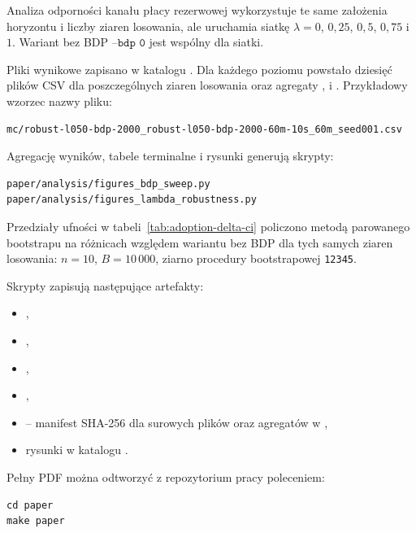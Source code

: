 Analiza odporności kanału płacy rezerwowej wykorzystuje te same założenia horyzontu i liczby ziaren losowania, ale uruchamia siatkę \(\lambda = 0\), \(0{,}25\), \(0{,}5\), \(0{,}75\) i \(1\). Wariant bez BDP \(\texttt{--bdp 0}\) jest wspólny dla siatki.

Pliki wynikowe zapisano w katalogu . Dla każdego poziomu powstało dziesięć plików CSV dla poszczególnych ziaren losowania oraz agregaty ,  i . Przykładowy wzorzec nazwy pliku:

\begin{verbatim}
mc/robust-l050-bdp-2000_robust-l050-bdp-2000-60m-10s_60m_seed001.csv
\end{verbatim}

Agregację wyników, tabele terminalne i rysunki generują skrypty:

\begin{verbatim}
paper/analysis/figures_bdp_sweep.py
paper/analysis/figures_lambda_robustness.py
\end{verbatim}

Przedziały ufności w tabeli~\ref{tab:adoption-delta-ci} policzono metodą parowanego bootstrapu na różnicach względem wariantu bez BDP dla tych samych ziaren losowania: \(n = 10\), \(B = 10\,000\), ziarno procedury bootstrapowej \texttt{12345}.

Skrypty zapisują następujące artefakty:

\begin{itemize}
    \item {},
    \item {},
    \item {},
    \item {},
    \item {} -- manifest SHA-256 dla surowych plików  oraz agregatów w ,
    \item rysunki w katalogu .
\end{itemize}

Pełny PDF można odtworzyć z repozytorium pracy poleceniem:

\begin{verbatim}
cd paper
make paper
\end{verbatim}

